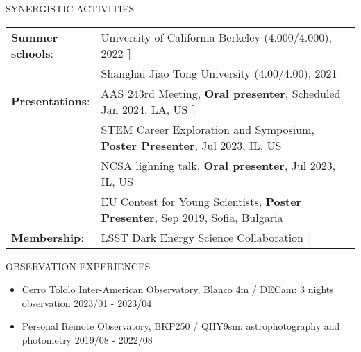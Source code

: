 \documentclass[10pt]{article} %
\begin{document}
\begin{section}{SYNERGISTIC ACTIVITIES}

\begin{tabular}{@{}p{0.2\linewidth}@{}p{0.8\linewidth}@{}}
    \textbf{Summer schools}: & University of California Berkeley (4.000/4.000), 2022 \hfill $\rceil$\\
    & Shanghai Jiao Tong University (4.00/4.00), 2021 \\
    \textbf{Presentations}: & AAS 243rd Meeting, \textbf{Oral presenter}, Scheduled Jan 2024, LA, US \hfill $\rceil$\\
    & STEM Career Exploration and Symposium, \textbf{Poster Presenter}, Jul 2023, IL, US \\
    & NCSA lighning talk, \textbf{Oral presenter}, Jul 2023, IL, US \\
    & EU Contest for Young Scientists, \textbf{Poster Presenter}, Sep 2019, Sofia, Bulgaria \\
    \textbf{Membership}: &LSST Dark Energy Science Collaboration \hfill $\rceil$\\
\end{tabular}

\end{section}

\begin{section}{OBSERVATION EXPERIENCES}
    
\begin{itemize}[leftmargin=1.5em]
    \item Cerro Tololo Inter-American Observatory, Blanco 4m / DECam: 3 nights observation \hfill 2023/01 - 2023/04
    \item Personal Remote Observatory, BKP250 / QHY9sm: astrophotography and photometry \hfill 2019/08 - 2022/08
\end{itemize}

\end{section}
\end{document}
